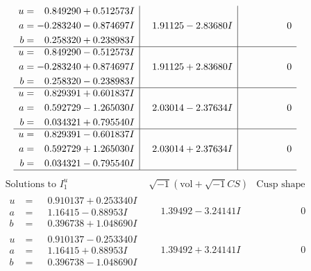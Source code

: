 \documentclass[1p]{elsarticle_modified}
\theoremstyle{definition}
\newcommand{\I}{\sqrt{-1}}
\begin{document}
$$\begin{array}{c|c|c}
\begin{aligned}
u &= \phantom{-}0.849290 + 0.512573 I \\
a &= -0.283240 - 0.874697 I \\
b &= \phantom{-}0.258320 + 0.238983 I\end{aligned}
 & \phantom{-}1.91125 - 2.83680 I & \phantom{-0.000000 } 0 \\ \hline\begin{aligned}
u &= \phantom{-}0.849290 - 0.512573 I \\
a &= -0.283240 + 0.874697 I \\
b &= \phantom{-}0.258320 - 0.238983 I\end{aligned}
 & \phantom{-}1.91125 + 2.83680 I & \phantom{-0.000000 } 0 \\ \hline\begin{aligned}
u &= \phantom{-}0.829391 + 0.601837 I \\
a &= \phantom{-}0.592729 - 1.265030 I \\
b &= \phantom{-}0.034321 + 0.795540 I\end{aligned}
 & \phantom{-}2.03014 - 2.37634 I & \phantom{-0.000000 } 0 \\ \hline\begin{aligned}
u &= \phantom{-}0.829391 - 0.601837 I \\
a &= \phantom{-}0.592729 + 1.265030 I \\
b &= \phantom{-}0.034321 - 0.795540 I\end{aligned}
 & \phantom{-}2.03014 + 2.37634 I & \phantom{-0.000000 } 0\\
 \hline 
 \end{array}$$\newpage$$\begin{array}{c|c|c}  
\text{Solutions to }I^u_{1}& \I (\text{vol} + \sqrt{-1}CS) & \text{Cusp shape}\\
 \hline 
\begin{aligned}
u &= \phantom{-}0.910137 + 0.253340 I \\
a &= \phantom{-}1.16415 - 0.88953 I \\
b &= \phantom{-}0.396738 + 1.048690 I\end{aligned}
 & \phantom{-}1.39492 - 3.24141 I & \phantom{-0.000000 } 0 \\ \hline\begin{aligned}
u &= \phantom{-}0.910137 - 0.253340 I \\
a &= \phantom{-}1.16415 + 0.88953 I \\
b &= \phantom{-}0.396738 - 1.048690 I\end{aligned}
 & \phantom{-}1.39492 + 3.24141 I & \phantom{-0.000000 } 0 \\ \hline\begin{aligned}

\end{aligned}
\end{array}$$
\end{document}
